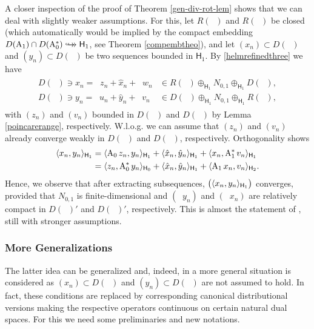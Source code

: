 \documentclass[a4paper]{amsart}
\renewcommand{\H}{\mathsf{H}}
\DeclareMathOperator{\Az}{A_{0}}
\DeclareMathOperator{\Azs}{A_{0}^{*}}
\DeclareMathOperator{\cAz}{\mathcal{A}_{0}}
\DeclareMathOperator{\cAzs}{\mathcal{A}_{0}^{*}}
\DeclareMathOperator{\Ao}{A_{1}}
\DeclareMathOperator{\Aos}{A_{1}^{*}}
\DeclareMathOperator{\cAo}{\mathcal{A}_{1}}
\DeclareMathOperator{\cAos}{\mathcal{A}_{1}^{*}}
\newcommand{\cptemb}{\hookto\hspace*{-0.85em}\hookto}
\begin{document}
A closer inspection of the proof of Theorem \ref{gen-div-rot-lem} shows that
we can deal with slightly weaker assumptions.
For this, let $R(\Az)$ and $R(\Ao)$ be closed 
(which automatically would be implied by the compact embedding $D(\Ao)\cap D(\Azs)\cptemb\H_{1}$,
see Theorem \ref{compembtheo}),
and let $(x_{n})\subset D(\Ao)$ and $(y_{n})\subset D(\Azs)$ 
be two sequences bounded in $\H_{1}$. 
By \eqref{helmrefinedthree} we have
\begin{align}
\label{HelmdecoweakA}
\begin{split}
D(\Ao)\ni x_{n}=\Az z_{n}+\hat{x}_{n}+\Aos w_{n}&\in R(\cAz)\oplus_{\H_{1}}N_{0,1}\oplus_{\H_{1}}D(\cAo),\\
D(\Azs)\ni y_{n}=\Az u_{n}+\hat{y}_{n}+\Aos v_{n}&\in D(\cAzs)\oplus_{\H_{1}}N_{0,1}\oplus_{\H_{1}}R(\cAos),
\end{split}
\end{align}
with $(z_{n})$ and $(v_{n})$ bounded in $D(\cAz)$ and $D(\cAos)$
by Lemma \ref{poincarerange}, respectively.
W.l.o.g. we can assume that
$(z_{n})$ and $(v_{n})$ already converge weakly in $D(\cAz)$ and $D(\cAos)$, respectively.
Orthogonality shows 
\begin{align}
\label{calcweakAstrong}
\begin{split}
\scp{x_{n}}{y_{n}}_{\H_{1}}
&=\scp{\Az z_{n}}{y_{n}}_{\H_{1}}
+\scp{\hat{x}_{n}}{\hat{y}_{n}}_{\H_{1}}
+\scp{x_{n}}{\Aos v_{n}}_{\H_{1}}\\
&=\scp{z_{n}}{\Azs y_{n}}_{\H_{0}}
+\scp{\hat{x}_{n}}{\hat{y}_{n}}_{\H_{1}}
+\scp{\Ao x_{n}}{v_{n}}_{\H_{2}}.
\end{split}
\end{align}
Hence, we observe that after extracting subsequences,
$\big(\scp{x_{n}}{y_{n}}_{\H_{1}}\big)$ converges, provided that
$N_{0,1}$ is finite-dimensional and 
$(\Azs y_{n})$ and $(\Ao x_{n})$ are relatively compact in
$D(\cAz)'$ and $D(\cAos)'$, respectively. 
This is almost the statement of \cite[Theorem 2.4]{waurick2018a},
still with stronger assumptions.

\subsubsection{More Generalizations}
\label{sec:moregen}

The latter idea can be generalized and, indeed, 
in \cite[Theorem 2.4]{waurick2018a} a more general situation is considered
as $(x_{n})\subset D(\Ao)$ and $(y_{n})\subset D(\Azs)$ are not assumed to hold. 
In fact, these conditions are replaced by corresponding canonical distributional versions
making the respective operators continuous on certain natural dual spaces.
For this we need some preliminaries and new notations.
\end{document}
